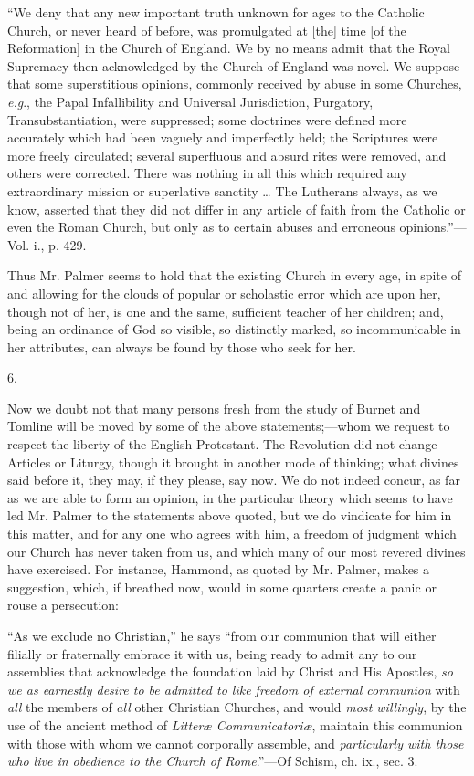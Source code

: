``We
deny that any new important truth unknown for ages to the Catholic
Church, or never heard of before, was promulgated at [the] time [of
the Reformation] in the Church of England. We by no means admit that
the Royal Supremacy then acknowledged by the Church of England was
novel. We suppose that some superstitious opinions, commonly received
by abuse in some Churches, \emph{e.g}., the Papal Infallibility and
Universal Jurisdiction, Purgatory, Transubstantiation, were
suppressed; some doctrines were defined more accurately which had been
vaguely and imperfectly held; the Scriptures were more freely
circulated; several superfluous and absurd
rites were removed, and others were corrected. There was nothing in
all this which required any extraordinary mission or superlative
sanctity … The Lutherans always, as we know, asserted that they did
not differ in any article of faith from the Catholic or even the Roman
Church, but only as to certain abuses and erroneous opinions.''—Vol. i., p. 429.

Thus Mr. Palmer seems to hold that the existing
Church in every age, in spite of and allowing for the clouds of
popular or scholastic error which are upon her, though not of her, is
one and the same, sufficient teacher of her children; and, being an
ordinance of God so visible, so distinctly marked, so incommunicable
in her attributes, can always be found by those who seek for her.

6.

Now we doubt not that many persons fresh from the
study of Burnet and Tomline will be moved by some of the above
statements;—whom we request to respect the liberty of the English
Protestant. The Revolution did not change Articles or Liturgy, though
it brought in another mode of thinking; what divines said before it,
they may, if they please, say now. We do not indeed concur, as far as
we are able to form an opinion, in the particular theory which seems
to have led Mr. Palmer to the statements above quoted, but we do
vindicate for him in this matter, and for any one who agrees with him,
a freedom of judgment which our Church has never taken from us, and
which many of our most revered divines have exercised. For instance,
Hammond, as quoted by Mr. Palmer, makes a suggestion, which, if
breathed now, would in some quarters create a panic or rouse a
persecution:

``As
we exclude no Christian,'' he says ``from our communion that will either
filially or fraternally embrace it with us, being ready to
admit any to our assemblies that acknowledge the foundation laid by
Christ and His Apostles, \emph{so we as earnestly desire to be admitted
to like freedom of external communion} with \emph{all} the members
of \emph{all} other Christian Churches, and would \emph{most willingly},
by the use of the ancient method of \emph{Litteræ Communicatoriæ},
maintain this communion with those with whom we cannot corporally
assemble, and \emph{particularly with those who live in obedience to the
Church of Rome}.''—Of Schism, ch. ix., sec. 3.


